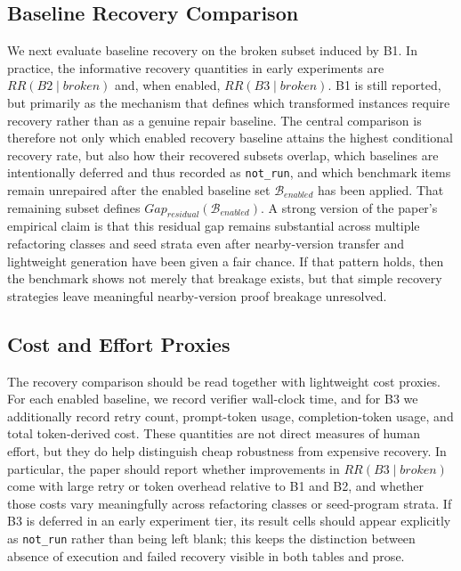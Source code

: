 \subsection{Baseline Recovery Comparison}

We next evaluate baseline recovery on the broken subset induced by B1. In practice, the informative recovery quantities in early experiments are $RR(B2 \mid \mathit{broken})$ and, when enabled, $RR(B3 \mid \mathit{broken})$. B1 is still reported, but primarily as the mechanism that defines which transformed instances require recovery rather than as a genuine repair baseline. The central comparison is therefore not only which enabled recovery baseline attains the highest conditional recovery rate, but also how their recovered subsets overlap, which baselines are intentionally deferred and thus recorded as \texttt{not\_run}, and which benchmark items remain unrepaired after the enabled baseline set $\mathcal{B}_{\mathit{enabled}}$ has been applied. That remaining subset defines $Gap_{\mathit{residual}}(\mathcal{B}_{\mathit{enabled}})$. A strong version of the paper's empirical claim is that this residual gap remains substantial across multiple refactoring classes and seed strata even after nearby-version transfer and lightweight generation have been given a fair chance. If that pattern holds, then the benchmark shows not merely that breakage exists, but that simple recovery strategies leave meaningful nearby-version proof breakage unresolved.



\subsection{Cost and Effort Proxies}

The recovery comparison should be read together with lightweight cost proxies. For each enabled baseline, we record verifier wall-clock time, and for B3 we additionally record retry count, prompt-token usage, completion-token usage, and total token-derived cost. These quantities are not direct measures of human effort, but they do help distinguish cheap robustness from expensive recovery. In particular, the paper should report whether improvements in $RR(B3 \mid \mathit{broken})$ come with large retry or token overhead relative to B1 and B2, and whether those costs vary meaningfully across refactoring classes or seed-program strata. If B3 is deferred in an early experiment tier, its result cells should appear explicitly as \texttt{not\_run} rather than being left blank; this keeps the distinction between absence of execution and failed recovery visible in both tables and prose.

